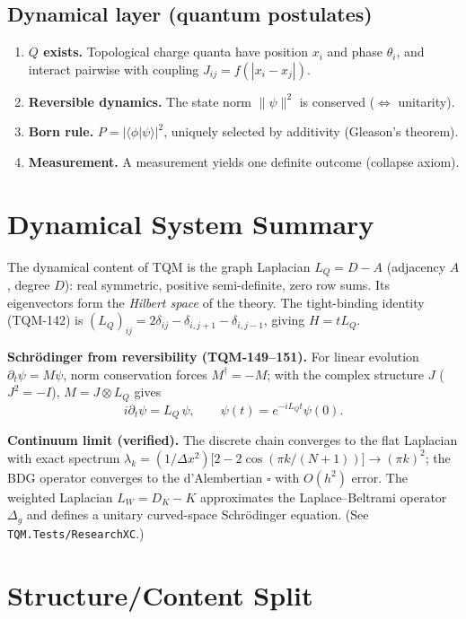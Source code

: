 \documentclass[11pt,a4paper]{article}
\begin{document}
\subsection{Dynamical layer (quantum postulates)}
\begin{enumerate}
\item \textbf{$Q$ exists.} Topological charge quanta have position $x_i$ and phase
      $\theta_i$, and interact pairwise with coupling $J_{ij}=f(|x_i-x_j|)$.
\item \textbf{Reversible dynamics.} The state norm $\|\psi\|^2$ is conserved
      ($\Leftrightarrow$ unitarity).
\item \textbf{Born rule.} $P=|\langle\phi|\psi\rangle|^2$, uniquely selected by additivity
      (Gleason's theorem).
\item \textbf{Measurement.} A measurement yields one definite outcome (collapse axiom).
\end{enumerate}

\section{Dynamical System Summary}
\label{sec:dynamics}

The dynamical content of TQM is the graph Laplacian $L_Q=D-A$ (adjacency $A$, degree $D$):
real symmetric, positive semi-definite, zero row sums. Its eigenvectors form the
\emph{Hilbert space} of the theory. The tight-binding identity (TQM-142) is
$(L_Q)_{ij}=2\delta_{ij}-\delta_{i,j+1}-\delta_{i,j-1}$, giving $H=tL_Q$.

\textbf{Schr\"odinger from reversibility (TQM-149--151).} For linear evolution
$\partial_t\psi=M\psi$, norm conservation forces $M^\dagger=-M$; with the complex
structure $J$ ($J^2=-I$), $M=J\otimes L_Q$ gives
\begin{equation}
i\partial_t\psi = L_Q\,\psi,\qquad \psi(t)=e^{-iL_Qt}\psi(0).
\end{equation}

\textbf{Continuum limit (verified).} The discrete chain converges to the flat Laplacian
with exact spectrum $\lambda_k=(1/\Delta x^2)\bigl[2-2\cos(\pi k/(N{+}1))\bigr]\to(\pi k)^2$;
the BDG operator converges to the d'Alembertian $\square$ with $O(h^2)$ error. The weighted
Laplacian $L_W=D_K-K$ approximates the Laplace--Beltrami operator $\Delta_g$ and defines a
unitary curved-space Schr\"odinger equation. (See \texttt{TQM.Tests/ResearchXC}.)

\section{Structure/Content Split}
\label{sec:split}
\end{document}
